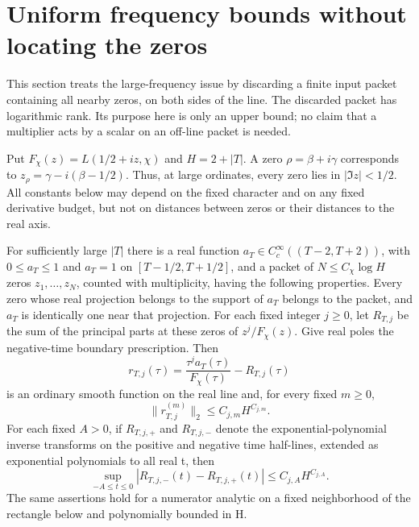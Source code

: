 \section{Uniform frequency bounds without locating the zeros}

This section treats the large-frequency issue by discarding a finite
input packet containing all nearby zeros, on both sides of the line.
The discarded packet has logarithmic rank.  Its purpose here is only
an upper bound; no claim that a multiplier acts by a scalar on an
off-line packet is needed.

Put $F_\chi(z)=L(1/2+iz,\chi)$ and $H=2+|T|$.
A zero $\rho=\beta+i\gamma$ corresponds to
$z_\rho=\gamma-i(\beta-1/2)$.
Thus, at large ordinates, every zero lies in $|\Im z|<1/2$.
All constants below may depend on the fixed character and on any
fixed derivative budget, but not on distances between zeros or
their distances to the real axis.

\begin{lemma}\label{lem:rectangle-parametrix}
For sufficiently large $|T|$ there is a real function
$a_T\in C_c^\infty((T-2,T+2))$, with $0\leq a_T\leq1$ and
$a_T=1$ on $[T-1/2,T+1/2]$, and a packet of
$N\leq C_\chi\log H$ zeros $z_1,\ldots,z_N$, counted with
multiplicity, having the following properties.
Every zero whose real projection belongs to the support of $a_T$
belongs to the packet, and $a_T$ is identically one near that
projection.  For each fixed integer $j\geq0$, let $R_{T,j}$ be
the sum of the principal parts at these zeros of
$z^j/F_\chi(z)$.  Give real poles the negative-time boundary
prescription.  Then
\[
 r_{T,j}(\tau)=\frac{\tau^j a_T(\tau)}{F_\chi(\tau)}
                                      -R_{T,j}(\tau)
\]
is an ordinary smooth function on the real line and, for every
fixed $m\geq0$,
\begin{equation}\label{eq:rectangle-remainder}
                 \|r_{T,j}^{(m)}\|_2\leq C_{j,m}H^{C_{j,m}}.
\end{equation}
For each fixed $A>0$, if $R_{T,j,+}$ and $R_{T,j,-}$ denote the
exponential-polynomial inverse transforms on the positive and
negative time half-lines, extended as exponential polynomials to
all real t, then
\begin{equation}\label{eq:rectangle-residue-difference}
 \sup_{-A\leq t\leq0}
 |R_{T,j,-}(t)-R_{T,j,+}(t)|\leq C_{j,A}H^{C_{j,A}}.
\end{equation}
The same assertions hold for a numerator analytic on a fixed
neighborhood of the rectangle below and polynomially bounded in H.
\end{lemma}

